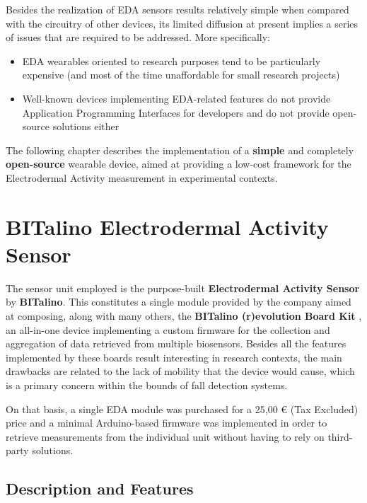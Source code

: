 \label{ch:implementation}

Besides the realization of EDA sensors results relatively simple when compared with the circuitry of other devices, its limited diffusion at present implies a series of issues that are required to be addressed. More specifically:

\begin{itemize}
    \item EDA wearables oriented to research purposes tend to be particularly expensive (and most of the time unaffordable for small research projects)
    \item Well-known devices implementing EDA-related features do not provide Application Programming Interfaces for developers and do not provide open-source solutions either
\end{itemize}

The following chapter describes the implementation of a \textbf{simple} and completely \textbf{open-source} wearable device, aimed at providing a low-cost framework for the Electrodermal Activity measurement in experimental contexts.

\section{BITalino Electrodermal Activity Sensor}\label{sec:bitalino}

The sensor unit employed is the purpose-built \textbf{Electrodermal Activity Sensor} by \textbf{BITalino}. This constitutes a single module provided by the company aimed at composing, along with many others, the \textbf{BITalino (r)evolution Board Kit} \cite{bitalino-general}, an all-in-one device implementing a custom firmware for the collection and aggregation of data retrieved from multiple biosensors. Besides all the features implemented by these boards result interesting in research contexts, the main drawbacks are related to the lack of mobility that the device would cause, which is a primary concern within the bounds of fall detection systems.

On that basis, a single EDA module was purchased for a 25,00 € (Tax Excluded) price and a minimal Arduino-based firmware was implemented in order to retrieve measurements from the individual unit without having to rely on third-party solutions.

\subsection{Description and Features}\label{sec:bitalino-features}

